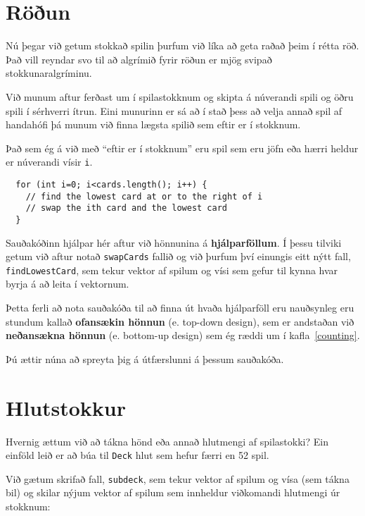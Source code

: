 
\section{Röðun}
\label{sorting}

Nú þegar við getum stokkað spilin þurfum við líka að geta raðað þeim í rétta röð.
Það vill reyndar svo til að algrímið fyrir röðun er mjög svipað stokkunaralgríminu.

Við munum aftur ferðast um í spilastokknum og skipta á núverandi spili og öðru spili í sérhverri ítrun.
Eini munurinn er sá að í stað þess að velja annað spil af handahófi þá munum við finna lægsta spilið sem eftir er í stokknum.

Það sem ég á við með ``eftir er í stokknum'' eru spil sem eru jöfn eða hærri heldur er núverandi vísir {\tt i}.

\begin{verbatim}
  for (int i=0; i<cards.length(); i++) {
    // find the lowest card at or to the right of i
    // swap the ith card and the lowest card
  }
\end{verbatim}
%
Sauðakóðinn hjálpar hér aftur við hönnunina á {\bf hjálparföllum}.
Í þessu tilviki getum við aftur notað {\tt swapCards} fallið og við þurfum því einungis eitt nýtt fall, {\tt findLowestCard},
sem tekur vektor af spilum og vísi sem gefur til kynna hvar byrja á að leita í vektornum.

Þetta ferli að nota sauðakóða til að finna út hvaða hjálparföll eru nauðsynleg eru stundum kallað 
{\bf ofansækin hönnun} (e. top-down design), sem er andstaðan við {\bf neðansækna hönnun} (e. bottom-up design) sem ég ræddi um í kafla~\ref{counting}.


Þú ættir núna að spreyta þig á útfærslunni á þessum sauðakóða.

\section {Hlutstokkur}

Hvernig ættum við að tákna hönd eða annað hlutmengi af spilastokki?
Ein einföld leið er að búa til {\tt Deck} hlut sem hefur færri en 52 spil. 

Við gætum skrifað fall, {\tt subdeck}, sem tekur vektor af spilum og vísa (sem tákna bil)
og skilar nýjum vektor af spilum sem innheldur viðkomandi hlutmengi úr stokknum:

